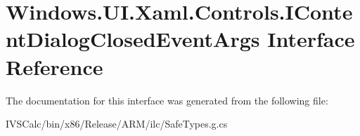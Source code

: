 \hypertarget{interface_windows_1_1_u_i_1_1_xaml_1_1_controls_1_1_i_content_dialog_closed_event_args}{}\section{Windows.\+U\+I.\+Xaml.\+Controls.\+I\+Content\+Dialog\+Closed\+Event\+Args Interface Reference}
\label{interface_windows_1_1_u_i_1_1_xaml_1_1_controls_1_1_i_content_dialog_closed_event_args}


The documentation for this interface was generated from the following file\+:\begin{DoxyCompactItemize}
\item 
I\+V\+S\+Calc/bin/x86/\+Release/\+A\+R\+M/ilc/Safe\+Types.\+g.\+cs\end{DoxyCompactItemize}
